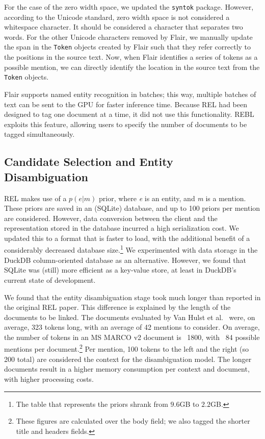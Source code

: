 For the case of the zero width space, we updated the \texttt{syntok} package. However, according to the Unicode standard, zero width space is not considered a whitespace character. It should be considered a character that separates two words. For the other Unicode characters removed by Flair, we manually update the span in the \texttt{Token} objects created by Flair such that they refer correctly to the positions in the source text. Now, when Flair identifies a series of tokens as a possible mention, we can directly identify the location in the source text from the \texttt{Token} objects.

Flair supports named entity recognition in batches; this way, multiple batches of text can be sent to the GPU for faster inference time. Because REL had been designed to tag one document at a time, it did not use this functionality. REBL exploits this feature, allowing users to specify the number of documents to be tagged simultaneously.

\subsection{Candidate Selection and Entity Disambiguation}
REL makes use of a $p(e|m)$ prior, where \textit{e} is an entity, and \textit{m} is a mention. These priors are saved in an (SQLite) database, and up to 100 priors per mention are considered. However, data conversion between the client and the representation stored in the database incurred a high serialization cost. We updated this to a format that is faster to load, with the additional benefit of a considerably decreased database size.\footnote{The table that represents the priors shrank from $9.6$GB to $2.2$GB.}
We experimented with data storage in the DuckDB column-oriented database as an alternative. However, we found that SQLite was (still) more efficient as a key-value store, at least in DuckDB's current state of development.

We found that the entity disambiguation stage took much longer than reported in the original REL paper. This difference is explained by the length of the documents to be linked. The documents evaluated by Van Hulst et al.~\cite{REL} were, on average, 323 tokens long, with an average of 42 mentions to consider. On average, the number of tokens in an MS MARCO v2 document is ~1800, with ~84 possible mentions per document.\footnote{These figures are calculated over the body field; we also tagged the shorter title and headers fields.}
Per mention, 100 tokens to the left and the right (so 200 total) are considered the context for the disambiguation model. 
The longer documents result in a higher memory consumption per context and document, with higher processing costs.

